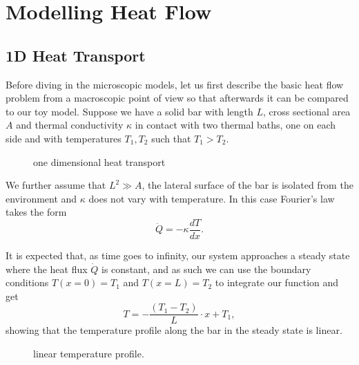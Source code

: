 
\chapter{Modelling Heat Flow}

\section{1D Heat Transport}

Before diving in the microscopic models, let us first describe the basic heat flow problem from a macroscopic point of view so that afterwards it can be compared to our toy model. Suppose we have a solid bar with length $ L $, cross sectional area $ A $ and thermal conductivity $ \kappa $ in contact with two thermal baths, one on each side and with temperatures $ T_{1},T_{2} $ such that $ T_{1} > T_{2} $.

\begin{figure}[H] 
		\centering 
		\fontsize{18}{14} 
		\label{ch2_1} 
		\caption{one dimensional heat transport}
\end{figure} 


We further assume that $ L^{2} \gg A $, the lateral surface of the bar is isolated from the environment and $ \kappa $ does not vary with temperature. In this case Fourier's law takes the form
\[ \dot{Q} = -\kappa \frac{d T}{d x}. \]

It is expected that, as time goes to infinity, our system approaches a steady state where the heat flux $ \dot{Q} $ is constant, and as such we can use the boundary conditions $ T(x=0)=T_{1} $ and $ T(x=L)=T_{2} $ to integrate our function and get
\[ T = - \frac{(T_{1}-T_{2})}{L}\cdot x + T_{1}, \]
showing that the temperature profile along the bar in the steady state is linear.

\begin{figure}[H] 
		\centering 
		\fontsize{26}{14} 
		\label{ch2_2} 
		\caption{linear temperature profile.}
\end{figure} 



